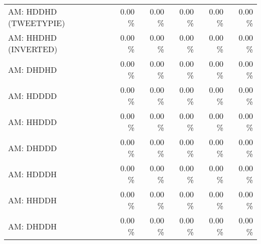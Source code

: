 \begin{tabular}{|l|r|r|r|r|r|}
AM: HDDHD (TWEETYPIE)        &    0.00 \%  &    0.00 \%  &    0.00 \%  &    0.00 \%  &    0.00 \% \\
AM: HHDHD (INVERTED)         &    0.00 \%  &    0.00 \%  &    0.00 \%  &    0.00 \%  &    0.00 \% \\
AM: DHDHD                    &    0.00 \%  &    0.00 \%  &    0.00 \%  &    0.00 \%  &    0.00 \% \\
AM: HDDDD                    &    0.00 \%  &    0.00 \%  &    0.00 \%  &    0.00 \%  &    0.00 \% \\
AM: HHDDD                    &    0.00 \%  &    0.00 \%  &    0.00 \%  &    0.00 \%  &    0.00 \% \\
AM: DHDDD                    &    0.00 \%  &    0.00 \%  &    0.00 \%  &    0.00 \%  &    0.00 \% \\
AM: HDDDH                    &    0.00 \%  &    0.00 \%  &    0.00 \%  &    0.00 \%  &    0.00 \% \\
AM: HHDDH                    &    0.00 \%  &    0.00 \%  &    0.00 \%  &    0.00 \%  &    0.00 \% \\
AM: DHDDH                    &    0.00 \%  &    0.00 \%  &    0.00 \%  &    0.00 \%  &    0.00 \% \\
\hline
\end{tabular}

